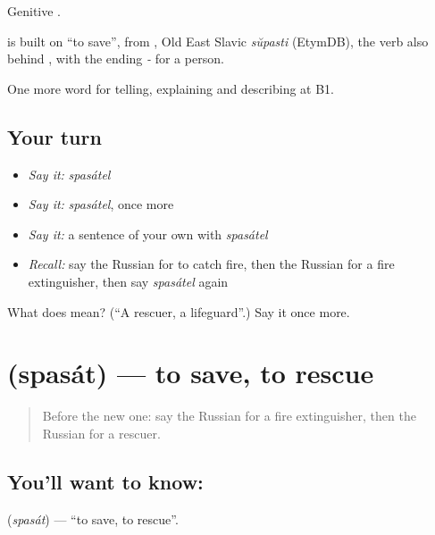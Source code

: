 Genitive \emph{}.

\begin{cousinweb}
\emph{} is built on \emph{} \textquotedblleft{}to save\textquotedblright{}, from \emph{}, Old East Slavic \emph{sŭpasti} (EtymDB), the verb also behind \emph{}, with the ending \emph{-} for a person.
\end{cousinweb}

\begin{grammarlens}[title={What you've built}]
One more word for telling, explaining and describing at B1.
\end{grammarlens}

\subsection*{Your turn}
\begin{itemize}
\raggedright
  \item \emph{Say it:} \emph{spasátel}
  \item \emph{Say it:} \emph{spasátel}, once more
  \item \emph{Say it:} a sentence of your own with \emph{spasátel}
  \item \emph{Recall:} say the Russian for to catch fire, then the Russian for a fire extinguisher, then say \emph{spasátel} again
\end{itemize}

\begin{tcolorbox}[breakable,colback=teal!4,colframe=teal!35!black,title={Before you move on}]
What does  mean? (\textquotedblleft{}A rescuer, a lifeguard\textquotedblright{}.) Say it once more.
\end{tcolorbox}
\section[\texorpdfstring{\ru{спасать} (spasát)}{спасать (spasát)}]{ (spasát) — to save, to rescue}

\label{lesson:RU-C296-spasat}



\begin{quote}
Before the new one: say the Russian for a fire extinguisher, then the Russian for a rescuer.
\end{quote}

\subsection*{You'll want to know: }
\textbf{} (\emph{spasát}) — \textquotedblleft{}to save, to rescue\textquotedblright{}.

